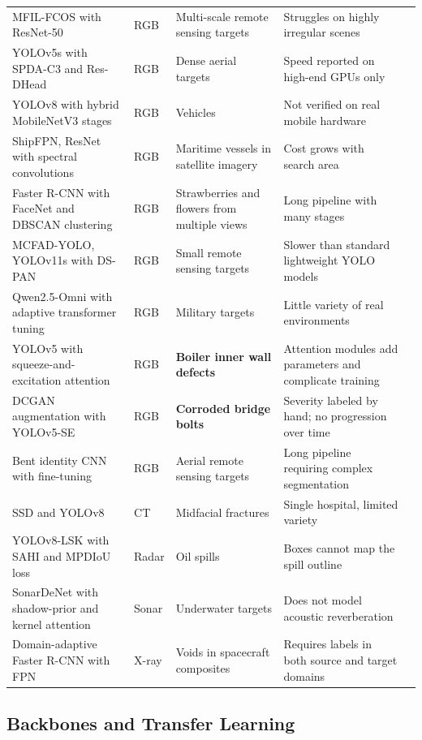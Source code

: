 \begin{xltabular}{\textwidth}{@{}X l X X l@{}}
MFIL-FCOS with ResNet-50 & RGB & Multi-scale remote sensing targets & Struggles on highly irregular scenes & \citep{Zhang2024} \\
YOLOv5s with SPDA-C3 and Res-DHead & RGB & Dense aerial targets & Speed reported on high-end GPUs only & \citep{Sun2023} \\
YOLOv8 with hybrid MobileNetV3 stages & RGB & Vehicles & Not verified on real mobile hardware & \citep{Liu2026a} \\
ShipFPN, ResNet with spectral convolutions & RGB & Maritime vessels in satellite imagery & Cost grows with search area & \citep{Mbietieu2025} \\
Faster R-CNN with FaceNet and DBSCAN clustering & RGB & Strawberries and flowers from multiple views & Long pipeline with many stages & \citep{Zheng2023} \\
MCFAD-YOLO, YOLOv11s with DS-PAN & RGB & Small remote sensing targets & Slower than standard lightweight YOLO models & \citep{Wang2026a} \\
Qwen2.5-Omni with adaptive transformer tuning & RGB & Military targets & Little variety of real environments & \citep{Zhang2026c} \\
YOLOv5 with squeeze-and-excitation attention & RGB & \textbf{Boiler inner wall defects} & Attention modules add parameters and complicate training & \citep{Sun2022} \\
DCGAN augmentation with YOLOv5-SE & RGB & \textbf{Corroded bridge bolts} & Severity labeled by hand; no progression over time & \citep{Li2024b} \\
Bent identity CNN with fine-tuning & RGB & Aerial remote sensing targets & Long pipeline requiring complex segmentation & \citep{Lalitha2022} \\
SSD and YOLOv8 & CT & Midfacial fractures & Single hospital, limited variety & \citep{Morita2024} \\
YOLOv8-LSK with SAHI and MPDIoU loss & Radar & Oil spills & Boxes cannot map the spill outline & \citep{Zhao2026} \\
SonarDeNet with shadow-prior and kernel attention & Sonar & Underwater targets & Does not model acoustic reverberation & \citep{He2026} \\
Domain-adaptive Faster R-CNN with FPN & X-ray & Voids in spacecraft composites & Requires labels in both source and target domains & \citep{Gong2022} \\
\end{xltabular}
\endgroup

\subsection{Backbones and Transfer Learning}


